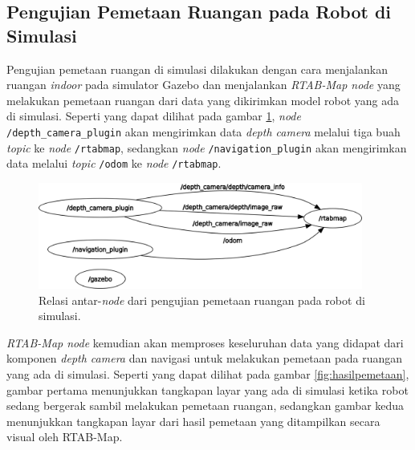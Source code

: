 \subsection{Pengujian Pemetaan Ruangan pada Robot di Simulasi}
\label{subsec:slamsimulasi}

Pengujian pemetaan ruangan di simulasi dilakukan dengan cara menjalankan ruangan \emph{indoor} pada simulator Gazebo dan menjalankan \emph{RTAB-Map node} yang melakukan pemetaan ruangan dari data yang dikirimkan model robot yang ada di simulasi.
Seperti yang dapat dilihat pada gambar \ref{fig:rosgraphslamsimulation},
  \emph{node} \lstinline{/depth_camera_plugin} akan mengirimkan data \emph{depth camera} melalui tiga buah \emph{topic} ke \emph{node} \lstinline{/rtabmap},
  sedangkan \emph{node} \lstinline{/navigation_plugin} akan mengirimkan data melalui \emph{topic} \lstinline{/odom} ke \emph{node} \lstinline{/rtabmap}.

\begin{figure}[ht]
  \centering
  \includegraphics[width=0.95\textwidth,keepaspectratio]{gambar/rosgraph-slam-simulation.png}
  \caption{Relasi antar-\emph{node} dari pengujian pemetaan ruangan pada robot di simulasi.}
  \label{fig:rosgraphslamsimulation}
\end{figure}

\emph{RTAB-Map node} kemudian akan memproses keseluruhan data yang didapat dari komponen \emph{depth camera} dan navigasi untuk melakukan pemetaan pada ruangan yang ada di simulasi.
Seperti yang dapat dilihat pada gambar \ref{fig:hasilpemetaan},
  gambar pertama menunjukkan tangkapan layar yang ada di simulasi ketika robot sedang bergerak sambil melakukan pemetaan ruangan,
  sedangkan gambar kedua menunjukkan tangkapan layar dari hasil pemetaan yang ditampilkan secara visual oleh RTAB-Map.

